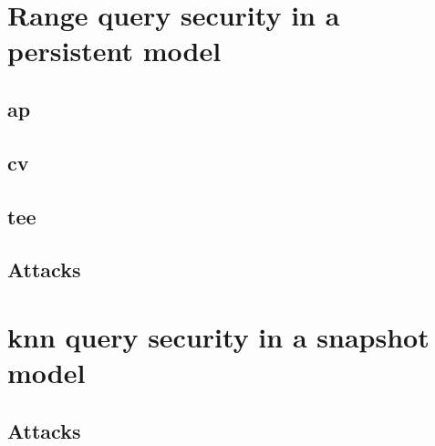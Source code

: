	\section{Range query security in a persistent model}

		\subsection{\texorpdfstring{\acrlong{ap}}{Access Pattern}}

		\subsection{\texorpdfstring{\acrlong{cv}}{Communication Volume}}

		\subsection{\texorpdfstring{\acrlong{tee}}{Trusted Execution Environment}}

		\subsection{Attacks}

	\section{\texorpdfstring{\acrshort{knn}}{kNN} query security in a snapshot model}

		\subsection{Attacks}
